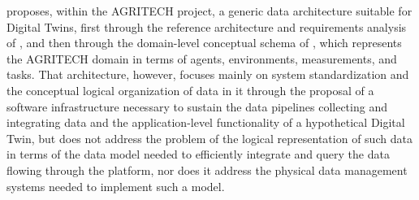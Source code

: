\label{chap:datamodel-dt}


 proposes, within the AGRITECH project, a generic data architecture suitable for Digital Twins, first through the reference architecture and requirements analysis of , and then through the domain-level conceptual schema of , which represents the AGRITECH domain in terms of agents, environments, measurements, and tasks. That architecture, however, focuses mainly on system standardization and the conceptual logical organization of data in it through the proposal of a software infrastructure necessary to sustain the data pipelines collecting and integrating data and the application-level functionality of a hypothetical Digital Twin, but does not address the problem of the logical representation of such data in terms of the data model needed to efficiently integrate and query the data flowing through the platform, nor does it address the physical data management systems needed to implement such a model.


